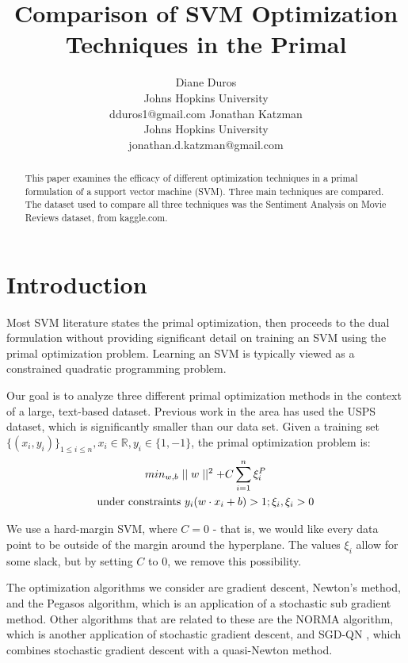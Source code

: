 \documentclass[letterpaper, 11pt]{article}
\title{Comparison of SVM Optimization Techniques in the Primal}
\author{Diane Duros \\
	Johns Hopkins University\\
	dduros1@gmail.com
\And Jonathan Katzman\\
	Johns Hopkins University\\
	jonathan.d.katzman@gmail.com}
\begin{document}
\maketitle

\begin{abstract}
This paper examines the efficacy of different optimization techniques in a primal formulation of a support vector machine (SVM).  Three main techniques are compared.  The dataset used to compare all three techniques was the Sentiment Analysis on Movie Reviews dataset, from kaggle.com.
\end{abstract}
                                                                                                                                                                                                                                                                           
\section{Introduction}
Most SVM literature states the primal optimization, then proceeds to the dual formulation without providing significant detail on training an SVM using the primal optimization problem.  Learning an SVM is typically viewed as a constrained quadratic programming problem.

Our goal is to analyze three different primal optimization methods in the context of a large, text-based dataset.  Previous work in the area\cite{chapelle2007training} has used the USPS dataset, which is significantly smaller than our data set.  Given a training set $\{ (x_i, y_i) \}_{1\le i\le n}, x_i \in \mathbb{R}, y_i \in \{1, -1\} $, the primal optimization problem is:
\begin{gather} min_{w,b} \mid \mid w \mid \mid ^2 + C\sum_{i=1}^n \xi_i^P\notag\\ 
\text{under constraints } y_i(w\cdot x_i + b) > 1; \xi_i, \xi_i > 0\label{primalobj}\end{gather}

We use a hard-margin SVM, where $C=0$ - that is, we would like every data point to be outside of the margin around the hyperplane.  The values $\xi_i$ allow for some slack, but by setting $C$ to $0$, we remove this possibility.

The optimization algorithms we consider are gradient descent, Newton's method, and the Pegasos algorithm, which is an application of a stochastic sub gradient method.  Other algorithms that are related to these are the NORMA algorithm\cite{norma}, which is another application of stochastic gradient descent, and SGD-QN \cite{sgdqn}, which combines stochastic gradient descent with a quasi-Newton method.
\end{document}
